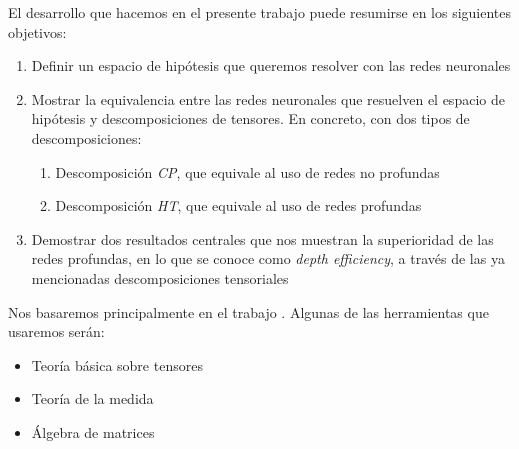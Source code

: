 El desarrollo que hacemos en el presente trabajo puede resumirse en los siguientes objetivos:

\begin{enumerate}
    \item Definir un espacio de hipótesis que queremos resolver con las redes neuronales
    \item Mostrar la equivalencia entre las redes neuronales que resuelven el espacio de hipótesis y descomposiciones de tensores. En concreto, con dos tipos de descomposiciones:
        \begin{enumerate}
            \item Descomposición \textit{CP}, que equivale al uso de redes no profundas
            \item Descomposición \textit{HT}, que equivale al uso de redes profundas
        \end{enumerate}

    \item Demostrar dos resultados centrales que nos muestran la superioridad de las redes profundas, en lo que se conoce como \textit{depth efficiency}, a través de las ya mencionadas descomposiciones tensoriales
\end{enumerate}

Nos basaremos principalmente en el trabajo \cite{matematicas:principal}. Algunas de las herramientas que usaremos serán:

\begin{itemize}
    \item Teoría básica sobre tensores
    \item Teoría de la medida
    \item Álgebra de matrices
\end{itemize}


\endinput(i.e. of functions that are efﬁciently realizable with a certain depth but
cannot be efﬁciently realized with shallower depths),

